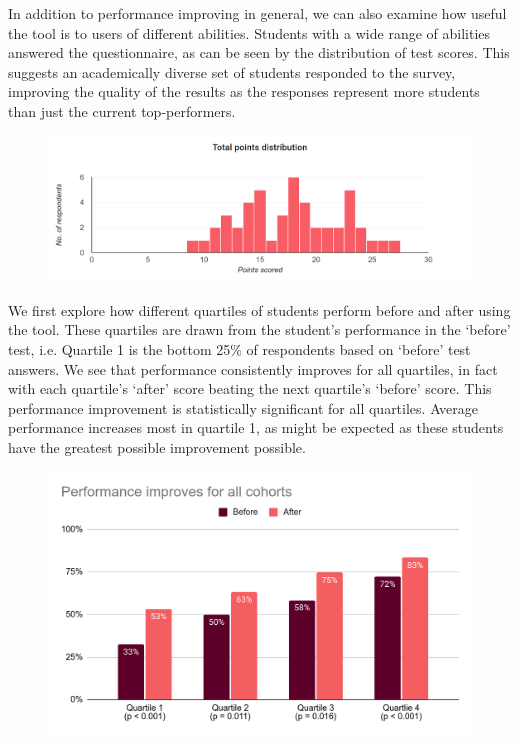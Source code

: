 \documentclass[a4paper,fleqn,oneside,12pt]{report}
\begin{document}
In addition to performance improving in general, we can also examine how useful the tool is to users of different abilities. Students with a wide range of abilities answered the questionnaire, as can be seen by the distribution of test scores. This suggests an academically diverse set of students responded to the survey, improving the quality of the results as the responses represent more students than just the current top-performers.

{\centering \begin{figure}[h!]
  \centering
  \includegraphics[width=0.9\linewidth]{images/image3.png}
  \label{figure:evaluation_testperformancedistribution}
\end{figure} \par}

We first explore how different quartiles of students perform before and after using the tool. These quartiles are drawn from the student's performance in the `before' test, i.e. Quartile 1 is the bottom 25\% of respondents based on `before' test answers. We see that performance consistently improves for all quartiles, in fact with each quartile's `after' score beating the next quartile's `before' score. This performance improvement is statistically significant for all quartiles. Average performance increases most in quartile 1, as might be expected as these students have the greatest possible improvement possible.

{\centering \begin{figure}[h!]
  \centering
  \includegraphics[width=0.85\linewidth]{images/image20.png}
  \label{figure:evaluation_testperformancecohorts}
\end{figure} \par}
\end{document}
